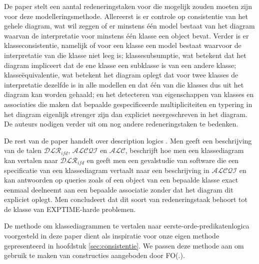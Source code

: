 De paper stelt een aantal redeneringstaken voor die mogelijk zouden moeten zijn voor deze modelleringsmethode. Allereerst is er controle op consistentie van het gehele diagram, wat wil zeggen of er minstens \'e\'en model bestaat van het diagram waarvan de interpretatie voor minstens \'e\'en klasse een object bevat. Verder is er klasseconsistentie, namelijk of voor een klasse een model bestaat waarvoor de interpretatie van die klasse niet leeg is; klassesubsumptie, wat betekent dat het diagram impliceert dat de ene klasse een subklasse is van een andere klasse; klasse\"equivalentie, wat betekent het diagram oplegt dat voor twee klasses de interpretatie dezelfde is in alle modellen en dat \'e\'en van die klasses dus uit het diagram kan worden gehaald; en het detecteren van eigenschappen van klasses en associaties die maken dat bepaalde gespecificeerde multipliciteiten en typering in het diagram eigenlijk strenger zijn dan expliciet neergeschreven in het diagram. De auteurs nodigen verder uit om nog andere redeneringstaken te bedenken.

De rest van de paper handelt over description logics . Men geeft een beschrijving van de talen $\mathcal{DLR}_{ifd}$, $\mathcal{ALCQI}$ en $\mathcal{ALC}$, beschrijft hoe men een klassediagram kan vertalen naar $\mathcal{DLR}_{ifd}$ en geeft men een gevalstudie van software die een specificatie van een klassediagram vertaalt naar een beschrijving in $\mathcal{ALCQI}$ en kan antwoorden op queries zoals of een object van een bepaalde klasse exact eenmaal deelneemt aan een bepaalde associatie zonder dat het diagram dit expliciet oplegt. Men concludeert dat dit soort van redeneringstaak behoort tot de klasse van EXPTIME-harde problemen.

De methode om klassediagrammen te vertalen naar eerste-orde-predikatenlogica voorgesteld in deze paper dient als inspiratie voor onze eigen methode gepresenteerd in hoofdstuk \ref{sec:consistentie}. We passen deze methode aan om gebruik te maken van constructies aangeboden door FO(.)\cite{DeCatBroes2014PLaa}.

